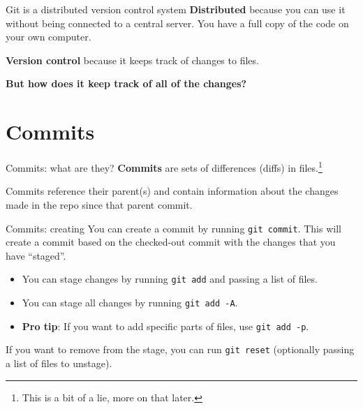 \documentclass{beeper}
\begin{document}
\begin{frame}{Git is a distributed version control system}
    \textbf{Distributed} because you can use it without being connected to a
    central server. You have a full copy of the code on your own computer.

    \textbf{Version control} because it keeps track of changes to files.

    \pause

    \textbf{But how does it keep track of all of the changes?}
\end{frame}

\section{Commits}

\begin{frame}{Commits: what are they?}
    \textbf{Commits} are sets of differences (diffs) in
    files.\footnote[frame]{This is a bit of a lie, more on that later.}
    \pause

    Commits reference their parent(s) and contain information about the changes
    made in the repo since that parent commit.

    \begin{center}
    \end{center}
\end{frame}

\begin{frame}{Commits: creating}
    You can create a commit by running \texttt{git commit}. This will create a
    commit based on the checked-out commit with the changes that you have
    ``staged''.
    \pause

    \begin{itemize}[<+->]
        \item You can stage changes by running \texttt{git add} and passing a
            list of files.
        \item You can stage all changes by running \texttt{git add -A}.
        \item \textbf{Pro tip}: If you want to add specific parts of files, use
            \texttt{git add -p}.
    \end{itemize}

    \pause[\thebeamerpauses]
    If you want to remove from the stage, you can run \texttt{git reset}
    (optionally passing a list of files to unstage).
\end{frame}
\end{document}
